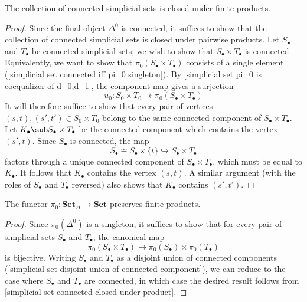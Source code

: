 \begin{proposition}\label{simplicial set connected closed under product}
The collection of connected simplicial sets is closed under finite products.
\end{proposition}
\begin{proof}
Since the final object $\Delta^0$ is connected, it suffices to show that the collection of connected simplicial sets is closed under pairwise products. Let $S_\bullet$ and $T_\bullet$ be connected simplicial sets; we wish to show that $S_\bullet\times T_\bullet$ is connected. Equivalently, we want to show that $\pi_0(S_\bullet\times T_\bullet)$ consists of a single element (\cref{simplicial set connected iff pi_0 singleton}). By \cref{simplicial set pi_0 is coequalizer of d_0,d_1}, the component map gives a surjection
\[u_0:S_0\times T_0\twoheadrightarrow \pi_0(S_\bullet\times T_\bullet)\]
It will therefore suffice to show that every pair of vertices $(s,t),(s',t')\in S_0\times T_0$ belong to the same connected component of $S_\bullet\times T_\bullet$. Let $K_\bullet\sub S_\bullet\times T_\bullet$ be the connected component which contains the vertex $(s',t)$. Since $S_\bullet$ is connected, the map
\[S_\bullet\cong S_\bullet\times\{t\}\hookrightarrow S_\bullet\times T_\bullet\]
factors through a unique connected component of $S_\bullet\times T_\bullet$, which must be equal to $K_\bullet$. It follows that $K_\bullet$ contains the vertex $(s,t)$. A similar argument (with the roles of $S_\bullet$ and $T_\bullet$ reversed) also shows that $K_\bullet$ contains $(s',t')$.
\end{proof}
\begin{corollary}\label{simplicial set pi_0 preserves finite product}
The functor $\pi_0:\mathbf{Set}_\Delta\to\mathbf{Set}$ preserves finite products.
\end{corollary}
\begin{proof}
Since $\pi_0(\Delta^0)$ is a singleton, it suffices to show that for every pair of simplicial sets $S_\bullet$ and $T_\bullet$, the canonical map
\[\pi_0(S_\bullet\times T_\bullet)\to\pi_0(S_\bullet)\times \pi_0(T_\bullet)\]
is bijective. Writing $S_\bullet$ and $T_\bullet$ as a disjoint union of connected components (\cref{simplicial set disjoint union of connected component}), we can reduce to the case where $S_\bullet$ and $T_\bullet$ are connected, in which case the desired result follows from \cref{simplicial set connected closed under product}.
\end{proof}
